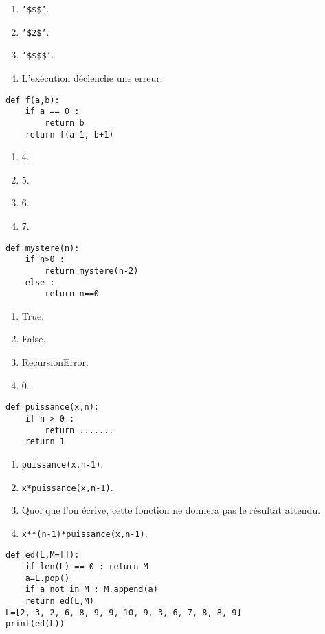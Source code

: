 \begin{enumerate}
\item \texttt{'\$\$\$'}.
\item \texttt{'\$2\$'}.
\item \texttt{'\$\$\$\$'}. %
\item L'exécution déclenche une erreur.
\end{enumerate}

\begin{lstlisting}
def f(a,b):
    if a == 0 :
        return b
    return f(a-1, b+1)
\end{lstlisting}

\begin{enumerate}
\item 4.
\item 5.
\item 6.
\item 7. %
\end{enumerate}

\begin{lstlisting}
def mystere(n):
    if n>0 :
        return mystere(n-2)
    else :
        return n==0
\end{lstlisting}

\begin{enumerate}
\item True.
\item False. %
\item RecursionError.
\item 0.
\end{enumerate}

\begin{lstlisting}
def puissance(x,n):
    if n > 0 : 
        return .......
    return 1
\end{lstlisting}

\begin{enumerate}
\item \texttt{puissance(x,n-1)}.
\item \texttt{x*puissance(x,n-1)}. %
\item Quoi que l'on écrive, cette fonction ne donnera pas le résultat attendu.
\item \texttt{x**(n-1)*puissance(x,n-1)}.
\end{enumerate}

\begin{lstlisting}
def ed(L,M=[]):
    if len(L) == 0 : return M
    a=L.pop()
    if a not in M : M.append(a)
    return ed(L,M)
L=[2, 3, 2, 6, 8, 9, 9, 10, 9, 3, 6, 7, 8, 8, 9]
print(ed(L))
\end{lstlisting}

